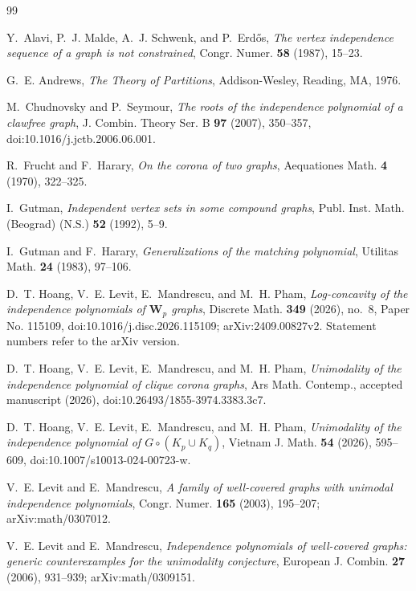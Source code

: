 \documentclass[11pt]{amsart}
\theoremstyle{remark}
\numberwithin{equation}{section}
\begin{document}
\begin{thebibliography}{99}

Y.~Alavi, P.~J. Malde, A.~J. Schwenk, and P.~Erd\H{o}s, \emph{The vertex independence sequence of a graph is not constrained}, Congr. Numer. \textbf{58} (1987), 15--23.

G.~E. Andrews, \emph{The Theory of Partitions}, Addison-Wesley, Reading, MA, 1976.

M.~Chudnovsky and P.~Seymour, \emph{The roots of the independence polynomial of a clawfree graph}, J. Combin. Theory Ser. B \textbf{97} (2007), 350--357, doi:10.1016/j.jctb.2006.06.001.

R.~Frucht and F.~Harary, \emph{On the corona of two graphs}, Aequationes Math. \textbf{4} (1970), 322--325.

I.~Gutman, \emph{Independent vertex sets in some compound graphs}, Publ. Inst. Math. (Beograd) (N.S.) \textbf{52} (1992), 5--9.

I.~Gutman and F.~Harary, \emph{Generalizations of the matching polynomial}, Utilitas Math. \textbf{24} (1983), 97--106.

D.~T. Hoang, V.~E. Levit, E.~Mandrescu, and M.~H. Pham, \emph{Log-concavity of the independence polynomials of $\mathbf{W}_p$ graphs}, Discrete Math. \textbf{349} (2026), no.~8, Paper No. 115109, doi:10.1016/j.disc.2026.115109; arXiv:2409.00827v2. Statement numbers refer to the arXiv version.

D.~T. Hoang, V.~E. Levit, E.~Mandrescu, and M.~H. Pham, \emph{Unimodality of the independence polynomial of clique corona graphs}, Ars Math. Contemp., accepted manuscript (2026), doi:10.26493/1855-3974.3383.3c7.

D.~T. Hoang, V.~E. Levit, E.~Mandrescu, and M.~H. Pham, \emph{Unimodality of the independence polynomial of $G\circ(K_p\cup K_q)$}, Vietnam J. Math. \textbf{54} (2026), 595--609, doi:10.1007/s10013-024-00723-w.

V.~E. Levit and E.~Mandrescu, \emph{A family of well-covered graphs with unimodal independence polynomials}, Congr. Numer. \textbf{165} (2003), 195--207; arXiv:math/0307012.

V.~E. Levit and E.~Mandrescu, \emph{Independence polynomials of well-covered graphs: generic counterexamples for the unimodality conjecture}, European J. Combin. \textbf{27} (2006), 931--939; arXiv:math/0309151.


\end{thebibliography}
\end{document}
